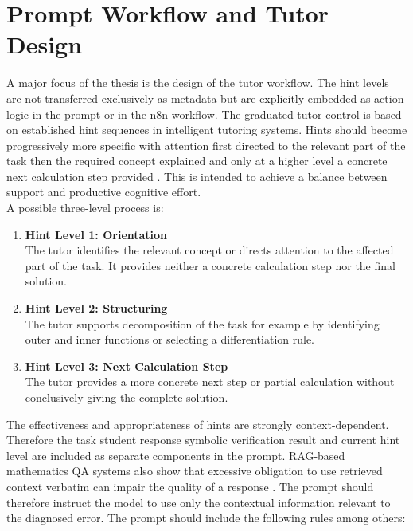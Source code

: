 \documentclass[11pt,a4paper,oneside,ngerman]{memoir}
\begin{document}
\section{Prompt Workflow and Tutor Design}
A major focus of the thesis is the design of the tutor workflow. The hint levels are not transferred exclusively as metadata but are explicitly embedded as action logic in the prompt or in the n8n workflow.
The graduated tutor control is based on established hint sequences in intelligent tutoring systems. Hints should become progressively more specific with attention first directed to the relevant part of the task then the required concept explained and only at a higher level a concrete next calculation step provided \autocite{vanlehn2006behavior,stamper2010hints}. This is intended to achieve a balance between support and productive cognitive effort.
\hspace{1 cm}\\
A possible three-level process is:
\begin{enumerate}
    \item \textbf{Hint Level 1: Orientation} \\
    The tutor identifies the relevant concept or directs attention to the affected part of the task. It provides neither a concrete calculation step nor the final solution.
    \item \textbf{Hint Level 2: Structuring} \\
    The tutor supports decomposition of the task for example by identifying outer and inner functions or selecting a differentiation rule.
    \item \textbf{Hint Level 3: Next Calculation Step} \\
    The tutor provides a more concrete next step or partial calculation without conclusively giving the complete solution.
\end{enumerate}
The effectiveness and appropriateness of hints are strongly context-dependent. Therefore the task student response symbolic verification result and current hint level are included as separate components in the prompt. RAG-based mathematics QA systems also show that excessive obligation to use retrieved context verbatim can impair the quality of a response \autocite{levonian2023ragmath}. The prompt should therefore instruct the model to use only the contextual information relevant to the diagnosed error.
The prompt should include the following rules among others:
\end{document}
